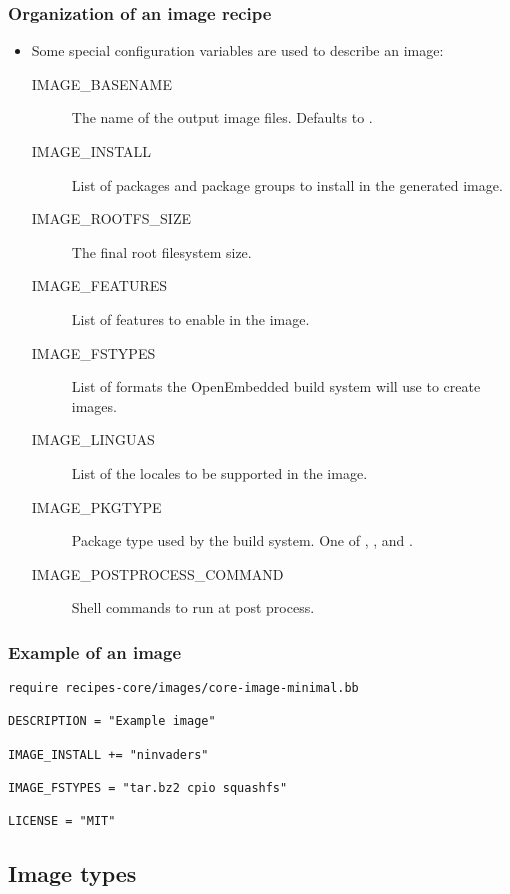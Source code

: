 \begin{frame}
  \frametitle{Organization of an image recipe}
  \begin{itemize}
    \item Some special configuration variables are used to describe an
      image:
      \begin{description}
        \item[IMAGE\_BASENAME] The name of the output image files.
          Defaults to .
        \item[IMAGE\_INSTALL] List of packages and package groups to
          install in the generated image.
        \item[IMAGE\_ROOTFS\_SIZE] The final root filesystem size.
        \item[IMAGE\_FEATURES] List of features to enable in the
          image.
        \item[IMAGE\_FSTYPES] List of formats the OpenEmbedded build
          system will use to create images.
        \item[IMAGE\_LINGUAS] List of the locales to be supported in
          the image.
        \item[IMAGE\_PKGTYPE] Package type used by the build system.
          One of , ,  and .
        \item[IMAGE\_POSTPROCESS\_COMMAND] Shell commands to run at
          post process.
      \end{description}
  \end{itemize}
\end{frame}

\begin{frame}[fragile]
  \frametitle{Example of an image}
  \begin{block}{}
    \begin{verbatim}
require recipes-core/images/core-image-minimal.bb

DESCRIPTION = "Example image"

IMAGE_INSTALL += "ninvaders"

IMAGE_FSTYPES = "tar.bz2 cpio squashfs"

LICENSE = "MIT"
    \end{verbatim}
  \end{block}
\end{frame}

\subsection{Image types}

